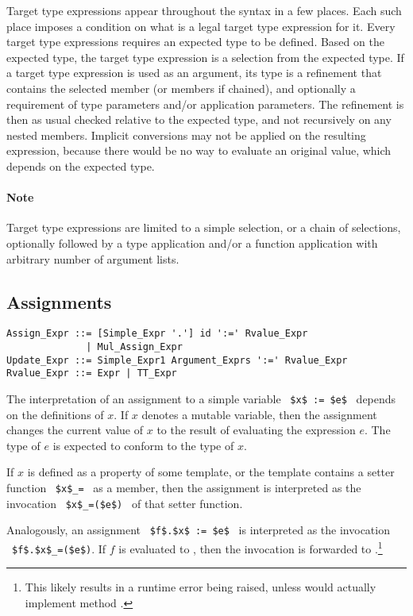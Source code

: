 Target type expressions appear throughout the syntax in a few places. Each such place imposes a condition on what is a legal target type expression for it. Every target type expressions requires an expected type to be defined. Based on the expected type, the target type expression is a selection from the expected type. If a target type expression is used as an argument, its type is a refinement that contains the selected member (or members if chained), and optionally a requirement of type parameters and/or application parameters. The refinement is then as usual checked relative to the expected type, and not recursively on any nested members. Implicit conversions may not be applied on the resulting expression, because there would be no way to evaluate an original value, which depends on the expected type. 

\paragraph{Note}
Target type expressions are limited to a simple selection, or a chain of selections, optionally followed by a type application and/or a function application with arbitrary number of argument lists. 





\subsection{Assignments}

\syntax\begin{lstlisting}
Assign_Expr ::= [Simple_Expr '.'] id ':=' Rvalue_Expr
              | Mul_Assign_Expr
Update_Expr ::= Simple_Expr1 Argument_Exprs ':=' Rvalue_Expr
Rvalue_Expr ::= Expr | TT_Expr
\end{lstlisting}

The interpretation of an assignment to a simple variable ~\lstinline!$x$ := $e$!~ depends on the definitions of $x$. If $x$ denotes a mutable variable, then the assignment changes the current value of $x$ to the result of evaluating the expression $e$. The type of $e$ is expected to conform to the type of $x$. 

If $x$ is defined as a property of some template, or the template contains a setter function ~\lstinline!$x$_=!~ as a member, then the assignment is interpreted as the invocation ~\lstinline!$x$_=($e$)!~ of that setter function. 

Analogously, an assignment ~\lstinline!$f$.$x$ := $e$!~ is interpreted as the invocation ~\lstinline!$f$.$x$_=($e$)!. If $f$ is evaluated to , then the invocation is forwarded to .\footnote{This likely results in a runtime error being raised, unless  would actually implement method .} 

